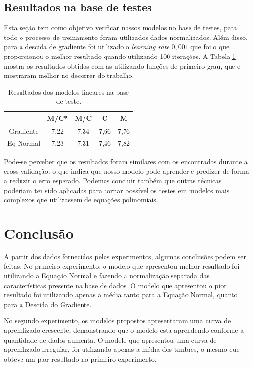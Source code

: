 \documentclass[conference]{IEEEtran}
\begin{document}
\subsection{Resultados na base de testes }

Esta seção tem como objetivo verificar nossos modelos no base de testes, para todo o processo de treinamento foram utilizados dados normalizados. Além disso, para a descida de gradiente foi utilizado o \emph{learning rate} $0,001$ que foi o que proporcionou o melhor resultado quando utilizando 100 iterações. A Tabela \ref{tab:result} mostra os resultados obtidos com as utilizando funções de primeiro grau, que e mostraram melhor no decorrer do trabalho.


\begin{table}[!h]
	\centering

	\begin{tabular}{ccccc}
		\hline
		& \textbf{M/C*} & \textbf{M/C} & \textbf{C} & \textbf{M} \\ \hline
		Gradiente & 7,22          & 7,34         & 7,66       & 7,76       \\
		Eq Normal & 7,23          & 7,31         & 7,46       & 7,82       \\ \hline
	\end{tabular}
	\caption{Resultados dos modelos lineares na base de teste.}
	\label{tab:result}
\end{table}

Pode-se perceber que os resultados foram similares com os encontrados durante a cross-validação, o que indica que nosso modelo pode aprender e predizer de forma a reduzir o erro esperado. Podemos concluir também que outras técnicas poderiam ter sido aplicadas para tornar possível os testes em modelos mais complexos que utilizassem de equações polinomiais.


\section{Conclusão} \label{sec:conc}

A partir dos dados fornecidos pelos experimentos, algumas conclusões podem ser feitas. No primeiro experimento, o modelo que apresentou melhor resultado foi utilizando a Equação Normal e fazendo a normalização separada das características presente na base de dados. O modelo que apresentou o pior resultado foi utilizando apenas a média tanto para a Equação Normal, quanto para a Descida do Gradiente.

No segundo experimento, os modelos propostos apresentaram uma curva de aprendizado crescente, demonstrando que o modelo esta aprendendo conforme a quantidade de dados aumenta. O modelo que apresentou uma curva de aprendizado irregular, foi utilizando apenas a média dos timbres, o mesmo que obteve um pior resultado no primeiro experimento.
\end{document}
